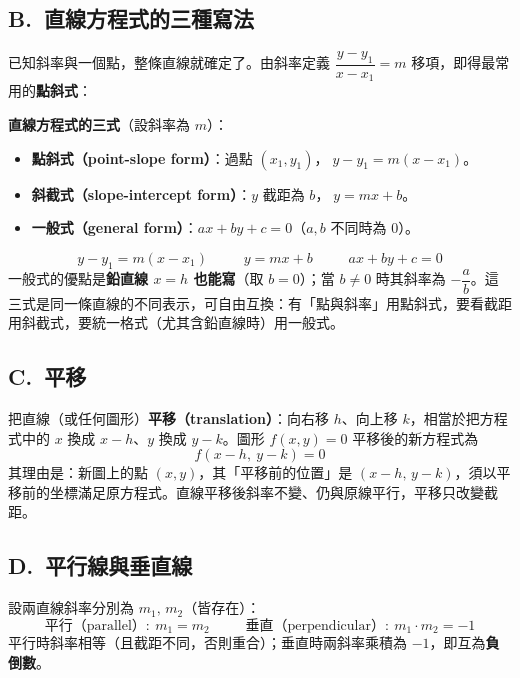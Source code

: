 \documentclass[11pt]{article}
\begin{document}
\subsection*{\sffamily B.\ 直線方程式的三種寫法}

已知斜率與一個點，整條直線就確定了。由斜率定義 $\dfrac{y-y_1}{x-x_1}=m$ 移項，即得最常用的\textbf{點斜式}：

\textbf{直線方程式的三式}（設斜率為 $m$）：
\begin{itemize}\setlength{\itemsep}{1pt}
\item \textbf{點斜式（point-slope form）}：過點 $(x_1,y_1)$，$\;y-y_1=m(x-x_1)$。
\item \textbf{斜截式（slope-intercept form）}：$y$ 截距為 $b$，$\;y=mx+b$。
\item \textbf{一般式（general form）}：$ax+by+c=0$（$a,b$ 不同時為 $0$）。
\end{itemize}
$$\boxed{\;y-y_1=m(x-x_1)\;}\qquad\boxed{\;y=mx+b\;}\qquad\boxed{\;ax+by+c=0\;}$$
一般式的優點是\textbf{鉛直線 $x=h$ 也能寫}（取 $b=0$）；當 $b\ne0$ 時其斜率為 $-\dfrac{a}{b}$。這三式是同一條直線的不同表示，可自由互換：有「點與斜率」用點斜式，要看截距用斜截式，要統一格式（尤其含鉛直線時）用一般式。

\subsection*{\sffamily C.\ 平移}

把直線（或任何圖形）\textbf{平移（translation）}：向右移 $h$、向上移 $k$，相當於把方程式中的 $x$ 換成 $x-h$、$y$ 換成 $y-k$。圖形 $f(x,y)=0$ 平移後的新方程式為
$$\boxed{\;f(x-h,\ y-k)=0\;}$$
其理由是：新圖上的點 $(x,y)$，其「平移前的位置」是 $(x-h,\,y-k)$，須以平移前的坐標滿足原方程式。直線平移後斜率不變、仍與原線平行，平移只改變截距。

\subsection*{\sffamily D.\ 平行線與垂直線}

設兩直線斜率分別為 $m_1,\,m_2$（皆存在）：
$$\boxed{\;\text{平行（parallel）}:\ m_1=m_2\;}\qquad\boxed{\;\text{垂直（perpendicular）}:\ m_1\cdot m_2=-1\;}$$
平行時斜率相等（且截距不同，否則重合）；垂直時兩斜率乘積為 $-1$，即互為\textbf{負倒數}。
\end{document}
